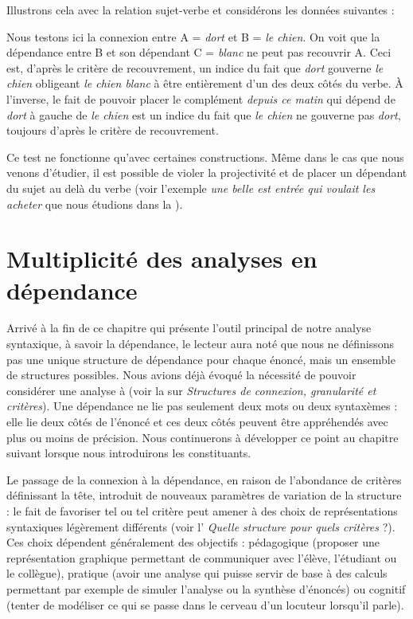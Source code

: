 Illustrons cela avec la relation sujet-verbe et considérons les données suivantes :

\ea
  \z
\z

Nous testons ici la connexion entre A = \textit{dort} et B = \textit{le chien}. On voit que la dépendance entre B et son dépendant C = \textit{blanc} ne peut pas recouvrir A. Ceci est, d'après le critère de recouvrement, un indice du fait que \textit{dort} gouverne \textit{le chien} obligeant \textit{le chien blanc} à être entièrement d’un des deux côtés du verbe. À l’inverse, le fait de pouvoir placer le complément \textit{depuis ce matin} qui dépend de \textit{dort} à gauche de \textit{le chien} est un indice du fait que \textit{le chien} ne gouverne pas \textit{dort}, toujours d'après le critère de recouvrement.

Ce test ne fonctionne qu’avec certaines constructions. Même dans le cas que nous venons d’étudier, il est possible de violer la projectivité et de placer un dépendant du sujet au delà du verbe (voir l’exemple \textit{une belle est entrée qui voulait les acheter} que nous étudions dans la ).

\section{Multiplicité des analyses en dépendance}\label{sec:3.3.33}

Arrivé à la fin de ce chapitre qui présente l’outil principal de notre analyse syntaxique, à savoir la dépendance, le lecteur aura noté que nous ne définissons pas une unique structure de dépendance pour chaque énoncé, mais un ensemble de structures possibles. Nous avions déjà évoqué la nécessité de pouvoir considérer une analyse à  (voir la  sur \textit{Structures de connexion, granularité et critères}). Une dépendance ne lie pas seulement deux mots ou deux syntaxèmes : elle lie deux côtés de l’énoncé et ces deux côtés peuvent être appréhendés avec plus ou moins de précision. Nous continuerons à développer ce point au chapitre suivant lorsque nous introduirons les constituants.

Le passage de la connexion à la dépendance, en raison de l’abondance de critères définissant la tête, introduit de nouveaux paramètres de variation de la structure : le fait de favoriser tel ou tel critère peut amener à des choix de représentations syntaxiques légèrement différents (voir l’ \textit{Quelle structure pour quels critères} ?). Ces choix dépendent généralement des objectifs : pédagogique (proposer une représentation graphique permettant de communiquer avec l’élève, l’étudiant ou le collègue), pratique (avoir une analyse qui puisse servir de base à des calculs permettant par exemple de simuler l’analyse ou la synthèse d’énoncés) ou cognitif (tenter de modéliser ce qui se passe dans le cerveau d’un locuteur lorsqu’il parle).

